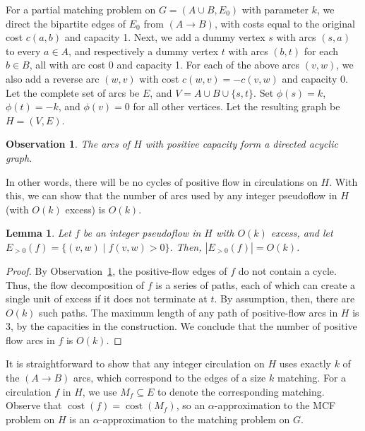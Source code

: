 \documentclass[11pt]{article}
\def\fsupply{\phi}
\theoremstyle{plain}
\newtheorem{lemma}{Lemma}
\newtheorem{observation}{Observation}
\def\cost{\operatorname{cost}}
\begin{document}
\begin{figure*}
For a partial matching problem on $G = (A \cup B, E_0)$ with parameter $k$, we
direct the bipartite edges of $E_0$ from $(A \to B)$, with costs equal to the
original cost $c(a, b)$ and capacity 1.
Next, we add a dummy vertex $s$ with arcs $(s, a)$ to every $a \in A$,
and respectively a dummy vertex $t$ with arcs $(b, t)$ for each $b \in B$,
all with arc cost 0 and capacity 1.
For each of the above arcs $(v, w)$, we also add a reverse arc $(w, v)$ with
cost $c(w, v) = -c(v, w)$ and capacity 0.
Let the complete set of arcs be $E$, and $V = A \cup B \cup \{s, t\}$.
Set $\fsupply(s) = k$, $\fsupply(t) = -k$, and $\fsupply(v) = 0$ for all other
vertices.
Let the resulting graph be $H = (V, E)$.

\begin{observation}
\label{observation:dag}
	The arcs of $H$ with positive capacity form a directed acyclic graph.
\end{observation}

In other words, there will be no cycles of positive flow in circulations on
$H$.
With this, we can show that the number of arcs used by any integer pseudoflow
in $H$ (with $O(k)$ excess) is $O(k)$.

\begin{lemma}
\label{lemma:reduction_count}
Let $f$ be an integer pseudoflow in $H$ with $O(k)$ excess, and let
$E_{>0}(f) = \{(v, w) \mid f(v, w) > 0\}$.
Then, $|E_{>0}(f)| = O(k)$.
\end{lemma}

\begin{proof}
By Observation~\ref{observation:dag}, the positive-flow edges of $f$ do not
contain a cycle.
Thus, the flow decomposition of $f$ is a series of paths, each of which can
create a single unit of excess if it does not terminate at $t$.
By assumption, then, there are $O(k)$ such paths.
The maximum length of any path of positive-flow arcs in $H$ is 3, by the
capacities in the construction.
We conclude that the number of positive flow arcs in $f$ is $O(k)$.
\end{proof}

It is straightforward to show that any integer circulation on $H$ uses exactly
$k$ of the $(A \to B)$ arcs, which correspond to the edges of a size $k$
matching.
For a circulation $f$ in $H$, we use $M_f \subseteq E$ to denote the
corresponding matching.
Observe that $\cost(f) = \cost(M_f)$, so an $\alpha$-approximation to the MCF
problem on $H$ is an $\alpha$-approximation to the matching problem on $G$.


\end{figure*}
\end{document}
